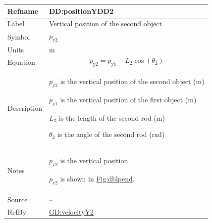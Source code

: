 \documentclass[12pt]{article}
\begin{document}
\begin{minipage}{\textwidth}
\begin{tabular}{>{\raggedright}p{}>{\raggedright\arraybackslash}p{}}
\toprule \textbf{Refname} & \textbf{DD:positionYDD2}
\label{DD:positionYDD2}
\\ \midrule
Label & Vertical position of the second object
        
\\ \midrule
Symbol & ${p_{\text{y}2}}$
         
\\ \midrule
Units & ${\text{m}}$
        
\\ \midrule
Equation & \begin{displaymath}
           {p_{\text{y}2}}={p_{\text{y}1}}-{L_{2}} \cos\left({θ_{2}}\right)
           \end{displaymath}
\\ \midrule
Description & \begin{symbDescription}
              \item{${p_{\text{y}2}}$ is the vertical position of the second object (${\text{m}}$)}
              \item{${p_{\text{y}1}}$ is the vertical position of the first object (${\text{m}}$)}
              \item{${L_{2}}$ is the length of the second rod (${\text{m}}$)}
              \item{${θ_{2}}$ is the angle of the second rod (${\text{rad}}$)}
              \end{symbDescription}
\\ \midrule
Notes & ${p_{\text{y}2}}$ is the vertical position
        
        ${p_{\text{y}2}}$ is shown in \hyperref[Figure:dblpend]{Fig:dblpend}.
        
\\ \midrule
Source & --
         
\\ \midrule
RefBy & \hyperref[GD:velocityY2]{GD:velocityY2}
        
\\ \bottomrule
\end{tabular}
\end{minipage}
\vspace{\baselineskip}
\noindent
\end{document}
